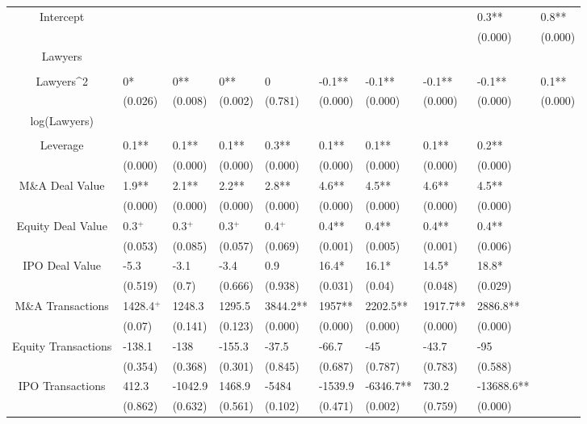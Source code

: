 \documentclass{article}
\begin{document}
\begin{table}[H]
\begin{tabular}{|clllllllll|}
Intercept &  &  &  &  &  &  &  & 0.3** & 0.8** \\ 
   &  &  &  &  &  &  &  & (0.000) & (0.000) \\ 
  Lawyers &  &  &  &  &  &  &  &  &  \\ 
   &  &  &  &  &  &  &  &  &  \\ 
  Lawyers^2 & 0* & 0** & 0** & 0 & -0.1** & -0.1** & -0.1** & -0.1** & 0.1** \\ 
   & (0.026) & (0.008) & (0.002) & (0.781) & (0.000) & (0.000) & (0.000) & (0.000) & (0.000) \\ 
  log(Lawyers) &  &  &  &  &  &  &  &  &  \\ 
   &  &  &  &  &  &  &  &  &  \\ 
  Leverage & 0.1** & 0.1** & 0.1** & 0.3** & 0.1** & 0.1** & 0.1** & 0.2** &  \\ 
   & (0.000) & (0.000) & (0.000) & (0.000) & (0.000) & (0.000) & (0.000) & (0.000) &  \\ 
  M\&A Deal Value & 1.9** & 2.1** & 2.2** & 2.8** & 4.6** & 4.5** & 4.6** & 4.5** &  \\ 
   & (0.000) & (0.000) & (0.000) & (0.000) & (0.000) & (0.000) & (0.000) & (0.000) &  \\ 
  Equity Deal Value & 0.3$^{+}$ & 0.3$^{+}$ & 0.3$^{+}$ & 0.4$^{+}$ & 0.4** & 0.4** & 0.4** & 0.4** &  \\ 
   & (0.053) & (0.085) & (0.057) & (0.069) & (0.001) & (0.005) & (0.001) & (0.006) &  \\ 
  IPO Deal Value & -5.3 & -3.1 & -3.4 & 0.9 & 16.4* & 16.1* & 14.5* & 18.8* &  \\ 
   & (0.519) & (0.7) & (0.666) & (0.938) & (0.031) & (0.04) & (0.048) & (0.029) &  \\ 
  M\&A Transactions & 1428.4$^{+}$ & 1248.3 & 1295.5 & 3844.2** & 1957** & 2202.5** & 1917.7** & 2886.8** &  \\ 
   & (0.07) & (0.141) & (0.123) & (0.000) & (0.000) & (0.000) & (0.000) & (0.000) &  \\ 
  Equity Transactions & -138.1 & -138 & -155.3 & -37.5 & -66.7 & -45 & -43.7 & -95 &  \\ 
   & (0.354) & (0.368) & (0.301) & (0.845) & (0.687) & (0.787) & (0.783) & (0.588) &  \\ 
  IPO Transactions & 412.3 & -1042.9 & 1468.9 & -5484 & -1539.9 & -6346.7** & 730.2 & -13688.6** &  \\ 
   & (0.862) & (0.632) & (0.561) & (0.102) & (0.471) & (0.002) & (0.759) & (0.000) &  \\ 

\end{tabular}
\end{table}
\end{document}
